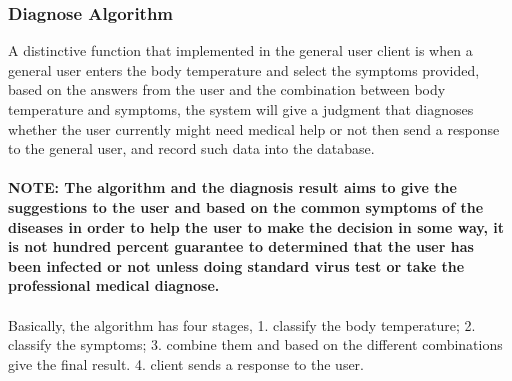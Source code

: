 \documentclass[12pt]{article}
\begin{document}
\subsubsection{Diagnose Algorithm}
A distinctive function that implemented in the general user client is when a general user enters the body temperature and select the symptoms provided, based on the answers from the user and the combination between body temperature and symptoms, the system will give a judgment that diagnoses whether the user currently might need medical help or not then send a response to the general user, and record such data into the database. 
\\
\\\textbf{NOTE: The algorithm and the diagnosis result aims to give the suggestions to the user and based on the common symptoms of the diseases in order to help the user to make the decision in some way, it is not hundred percent guarantee to determined that the user has been infected or not unless doing standard virus test or take the professional medical diagnose.} 
\\
\\Basically, the algorithm has four stages, 1. classify the body temperature; 2. classify the symptoms; 3. combine them and based on the different combinations give the final result. 4. client sends a response to the user. 
\end{document}

